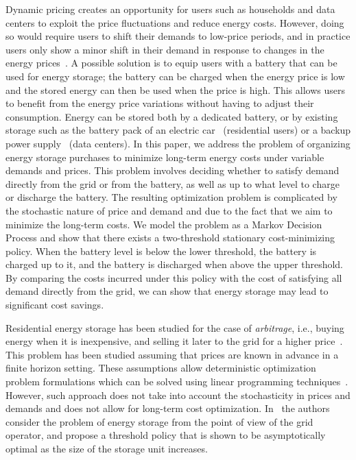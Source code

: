 \documentclass[journal]{IEEEtran}
\newcommand\1{\mathbf{1}}
\begin{document}
Dynamic pricing creates an opportunity for users such as households and data centers to exploit the price fluctuations and reduce energy costs. However, doing so would require users to shift their demands to low-price periods, and in practice users only show a minor shift in their demand in response to changes in the energy prices~\cite{AE08,Allcott11,BGN04,Lijesen07}.
A possible solution is to equip users with a battery that can be used for energy storage; the battery can be charged when the energy price is low and the stored energy can then be used when the price is high. This allows users to benefit from the energy price variations without having to adjust their consumption. Energy can be stored both by a dedicated battery, or by existing storage such as the battery pack of an electric car~\cite{PWA10} (residential users) or a backup power supply~\cite{UUNS11} (data centers). 
In this paper, we address the problem of organizing energy storage purchases to minimize long-term energy costs under variable demands and prices. This problem involves deciding whether to satisfy demand directly from the grid or from the battery, as well as up to what level to charge or discharge the battery.
The resulting optimization problem is complicated by the stochastic nature of price and demand and due to the fact that we aim to minimize the long-term costs. We model the problem as a Markov Decision Process and show that there exists a two-threshold stationary cost-minimizing policy. When the battery level is below the lower threshold, the battery is charged up to it, and the battery is discharged when above the upper threshold. By comparing the costs incurred under this policy with the cost of satisfying all demand directly from the grid, we can show that energy storage may lead to significant cost savings.

Residential energy storage has been studied for the case of {\em arbitrage}, i.e., buying energy when it is inexpensive, and selling it later to the grid for a higher price~\cite{GJM99}. This problem has been studied assuming that prices are known in advance in a finite horizon setting. These assumptions allow deterministic optimization problem formulations which can be solved using linear programming techniques~\cite{AD09,HCB10}. However, such approach does not take into account
the stochasticity in prices and demands and does not allow for long-term cost optimization. In~\cite{KHT11} the authors consider the problem of energy storage from the point of view of the grid operator, and propose a threshold policy that is shown to be asymptotically optimal as the size of the storage unit increases.
\end{document}
